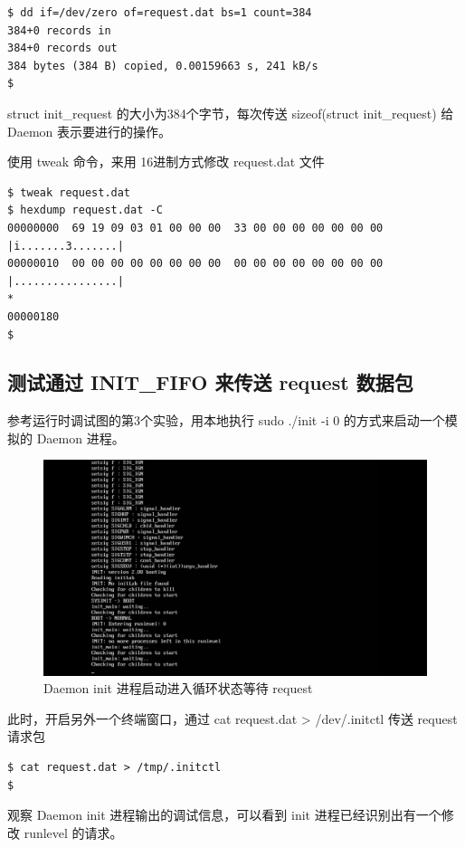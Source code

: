 {\begin{shaded}\begin{verbatim}
$ dd if=/dev/zero of=request.dat bs=1 count=384
384+0 records in
384+0 records out
384 bytes (384 B) copied, 0.00159663 s, 241 kB/s
$ 
\end{verbatim}\end{shaded}}
struct init\_request 的大小为384个字节，每次传送 sizeof(struct
init\_request) 给 Daemon 表示要进行的操作。

使用 tweak 命令，来用 16进制方式修改 request.dat 文件

{\begin{shaded}\begin{verbatim}
$ tweak request.dat 
$ hexdump request.dat -C
00000000  69 19 09 03 01 00 00 00  33 00 00 00 00 00 00 00  |i.......3.......|
00000010  00 00 00 00 00 00 00 00  00 00 00 00 00 00 00 00  |................|
*
00000180
$ 
\end{verbatim}\end{shaded}}
\subsection{测试通过 INIT\_FIFO 来传送 request 数据包}

参考运行时调试图的第3个实验，用本地执行 sudo ./init -i 0
的方式来启动一个模拟的 Daemon 进程。

\begin{figure}[htbp]
\centering
\includegraphics{./pictures/hack-daemon-init.png}
\caption{Daemon init 进程启动进入循环状态等待 request}
\end{figure}

此时，开启另外一个终端窗口，通过 cat request.dat \textgreater{}
/dev/.initctl 传送 request 请求包

{\begin{shaded}\begin{verbatim}
$ cat request.dat > /tmp/.initctl 
$ 
\end{verbatim}\end{shaded}}
观察 Daemon init 进程输出的调试信息，可以看到 init
进程已经识别出有一个修改 runlevel 的请求。

